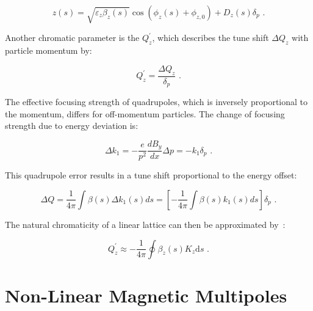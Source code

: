 \begin{equation}
    z(s) = \sqrt{\varepsilon_z \beta_z(s)} \cos \left( \phi_z(s) + \phi_{z, 0} \right) + D_z(s) \delta_p \text{ .}
    \label{equation:hill_solution_with_dispersion}
\end{equation}
\vspace{0.5mm}

Another chromatic parameter is the  \(Q_z^{\prime}\), which describes the tune shift \(\Delta Q_z\) with particle momentum by:

\begin{equation}
    Q^{\prime}_z = \frac{\Delta Q_z}{\delta_p} \text{ .}
    \label{equation:chromaticity_definition}
\end{equation}

The effective focusing strength of quadrupoles, which is inversely proportional to the momentum, differs for off-momentum particles.
The change of focusing strength due to energy deviation is:

\begin{equation}
	\Delta k_{1} = - \dfrac{e}{p^2} \dfrac{d B_{y}}{d x} \Delta p = -k_{1} \delta_p \text{ .}
    \label{equation:quadrupole_focusing_strength_deviation_from_dispersion}
\end{equation}

This quadrupole error results in a tune shift proportional to the energy offset:

\begin{equation}
	\Delta Q = \dfrac{1}{4 \pi} \int \beta(s) \Delta k_{1}(s) ds = \left[ - \frac{1}{4 \pi} \int \beta(s) k_{1}(s) ds \right] \delta_p \text{ .}
    \label{equation:tune_shift_from_dispersion}
\end{equation}
\vspace{0.5mm}

The natural chromaticity of a linear lattice can then be approximated by~\cite{CAS:Guiducci:Chromaticity}:

\begin{equation}
    Q_z^{\prime} \approx -\frac{1}{4 \pi} \oint \beta_z(s) K_z \mathrm{d}s \text{ .}
    \label{equation:natural_chromaticity_approximation}
\end{equation}

\section{Non-Linear Magnetic Multipoles}
\label{section:non_linear_magnetic_multipoles}

